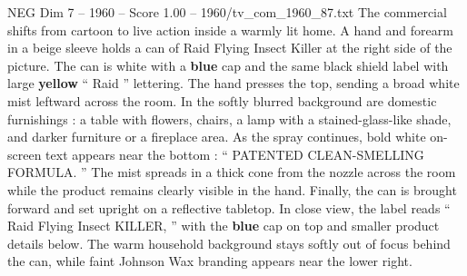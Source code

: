 \begin{textsample}{NEG Dim 7 – 1960 – Score 1.00 – 1960/tv\_com\_1960\_87.txt}
The commercial shifts from cartoon to live action inside a warmly lit home.
A hand and forearm in a beige sleeve holds a can of Raid Flying Insect Killer at the right side of the picture.
The can is white with a \textbf{blue} cap and the same black shield label with large \textbf{yellow} “ Raid ” lettering.
The hand presses the top, sending a broad white mist leftward across the room.
In the softly blurred background are domestic furnishings : a table with flowers, chairs, a lamp with a stained-glass-like shade, and darker furniture or a fireplace area.
As the spray continues, bold white on-screen text appears near the bottom : “ PATENTED CLEAN-SMELLING FORMULA. ” The mist spreads in a thick cone from the nozzle across the room while the product remains clearly visible in the hand.
Finally, the can is brought forward and set upright on a reflective tabletop.
In close view, the label reads “ Raid Flying Insect KILLER, ” with the \textbf{blue} cap on top and smaller product details below.
The warm household background stays softly out of focus behind the can, while faint Johnson Wax branding appears near the lower right.

\end{textsample}
